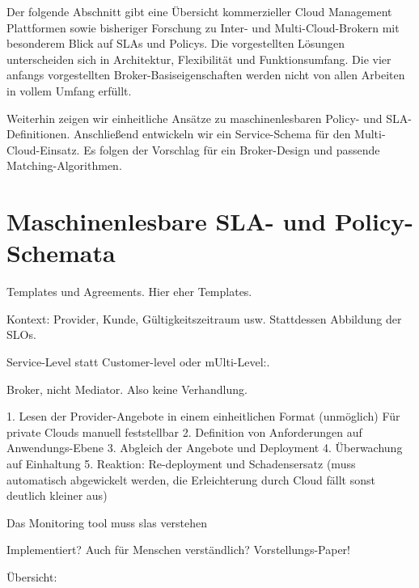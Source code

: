 \noindent
Der folgende Abschnitt gibt eine Übersicht kommerzieller Cloud Management Plattformen sowie bisheriger Forschung zu Inter- und Multi-Cloud-Brokern mit besonderem Blick auf SLAs und Policys. Die vorgestellten Lösungen unterscheiden sich in Architektur, Flexibilität und Funktionsumfang. Die vier anfangs vorgestellten Broker-Basiseigenschaften werden nicht von allen Arbeiten in vollem Umfang erfüllt.

Weiterhin zeigen wir einheitliche Ansätze zu maschinenlesbaren Policy- und SLA-Definitionen. Anschließend entwickeln wir ein Service-Schema für den Multi-Cloud-Einsatz. Es folgen der Vorschlag für ein Broker-Design und passende Matching-Algorithmen.



\section{Maschinenlesbare SLA- und Policy-Schemata}

Templates und Agreements. Hier eher Templates.

Kontext: Provider, Kunde, Gültigkeitszeitraum usw.
Stattdessen Abbildung der SLOs.

Service-Level statt Customer-level oder mUlti-Level:.

Broker, nicht Mediator. Also keine Verhandlung.

1. Lesen der Provider-Angebote in einem einheitlichen Format (unmöglich)
   Für private Clouds manuell feststellbar
2. Definition von Anforderungen auf Anwendungs-Ebene
3. Abgleich der Angebote und Deployment
4. Überwachung auf Einhaltung
5. Reaktion: Re-deployment und Schadensersatz (muss automatisch abgewickelt werden, die Erleichterung durch Cloud fällt sonst deutlich kleiner aus)

Das Monitoring tool muss slas verstehen

 
Implementiert?
Auch für Menschen verständlich?
Vorstellungs-Paper!

Übersicht: 

